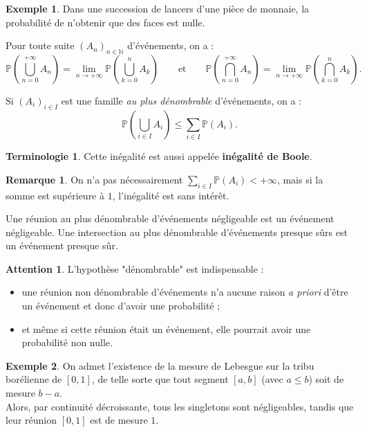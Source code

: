 \documentclass[french]{article}
\renewcommand{\P}{\mathbb{P}}
\newcommand{\N}{\mathbb{N}}
\theoremstyle{plain}
\theoremstyle{definition}
\newtheorem*{ex}{Exemple}
\newtheorem*{rmq}{Remarque}
\newtheorem*{terminologie}{Terminologie}
\newtheorem*{attention}{Attention}
\theoremstyle{remark}
\begin{document}
\begin{ex}
	Dans une succession de lancers d'une pièce de monnaie, la probabilité de n'obtenir que des faces est nulle.
\end{ex}

\begin{cor}%
	Pour toute suite $(A_n)_{n\in\N}$ d'événements, on a :
	$$\P\left(\bigcup_{n=0}^{+\infty}A_n\right)=\underset{n\to+\infty}{\lim}\P\left(\bigcup_{k=0}^{n}A_k\right)\quad\quad\text{et}\quad\quad\P\left(\bigcap_{n=0}^{+\infty}A_n\right)=\underset{n\to+\infty}{\lim}\P\left(\bigcap_{k=0}^{n}A_k\right).$$
\end{cor}

\begin{prop}[Sous-additivité de $\P$]%
	Si $(A_i)_{i\in I}$ est une famille \textit{au plus dénombrable} d'événements, on a :
	$$\P\left(\bigcup_{i\in I}A_i\right)\leqslant\sum_{i\in I}\P(A_i).$$
\end{prop}

\begin{terminologie}
	Cette inégalité est aussi appelée \textbf{inégalité de Boole}.
\end{terminologie}

\begin{rmq}
	On n'a pas nécessairement $\displaystyle\sum_{i\in I}\P(A_i)<+\infty$, mais si la somme est supérieure à $1$, l'inégalité est sans intérêt.
\end{rmq}

\begin{cor}%
	Une réunion au plus dénombrable d'événements négligeable est un événement négligeable. Une intersection au plus dénombrable d'événements presque sûrs est un événement presque sûr.
\end{cor}

\begin{attention}
	L'hypothèse "dénombrable" est indispensable :
	\begin{itemize}
		\item une réunion non dénombrable d'événements n'a aucune raison \textit{a priori} d'être un événement et donc d'avoir une probabilité ;
		\item et même si cette réunion était un événement, elle pourrait avoir une probabilité non nulle.
	\end{itemize}
\end{attention}

\begin{ex}
	On admet l'existence de la mesure de Lebesgue sur la tribu borélienne de $[0,1]$, de telle sorte que tout segment $[a,b]$ (avec $a\leqslant b$) soit de mesure $b-a$.\\
	Alors, par continuité décroissante, tous les singletons sont négligeables, tandis que leur réunion $[0,1]$ est de mesure $1$.
\end{ex}
\end{document}
